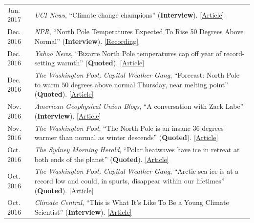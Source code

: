 \documentclass[margin,line,palatino,courier,10pt]{res}
\begin{document}
\begin{resume}
\begin{tabular}{@{}p{0.8in}p{4in}}
Jan. $2017$ & \textit{UCI News}, ``Climate change champions'' (\textbf{Interview}). \href{https://news.uci.edu/climate-change-champions/}{[Article]}\\
Dec. $2016$ & \textit{NPR}, ``North Pole Temperatures Expected To Rise 50 Degrees Above Normal'' (\textbf{Interview}). \href{http://www.npr.org/2016/12/21/506483966/north-pole-temperatures-expected-to-rise-50-degrees-above-normal}{[Recording]}\\
Dec. $2016$ & \textit{Yahoo News}, ``Bizarre North Pole temperatures cap off year of record-setting warmth'' (\textbf{Quoted}). \href{https://www.yahoo.com/news/bizarre-north-pole-temperatures-cap-off-year-of-record-setting-warmth-181727978.html?soc_src=social-sh&soc_trk=tw}{[Article]}\\
Dec. $2016$ & \textit{The Washington Post, Capital Weather Gang}, ``Forecast: North Pole to warm $50$ degrees above normal Thursday, near melting point'' (\textbf{Quoted}). \href{https://www.washingtonpost.com/news/capital-weather-gang/wp/2016/12/20/forecast-north-pole-to-warm-50-degrees-above-normal-thursday-near-melting-point/?dfgdfgdfgdfg&utm_term=.e648369ada7e}{[Article]}\\
Nov. $2016$ & \textit{American Geophysical Union Blogs}, ``A conversation with Zack Labe'' (\textbf{Interview}). \href{http://blogs.agu.org/mountainbeltway/2016/11/23/conversation-zack-labe/}{[Article]}\\
Nov. $2016$ & \textit{The Washington Post}, ``The North Pole is an insane 36 degrees warmer than normal as winter descends'' (\textbf{Quoted}). \href{https://www.washingtonpost.com/news/energy-environment/wp/2016/11/17/the-north-pole-is-an-insane-36-degrees-warmer-than-normal-as-winter-descends/?utm_term=.f2cb9596b3d8}{[Article]}\\
Oct. $2016$ & \textit{The Sydney Morning Herald}, ``Polar heatwaves have ice in retreat at both ends of the planet'' (\textbf{Quoted}). \href{http://www.smh.com.au/environment/climate-change/polar-heatwaves-have-ice-in-retreat-at-both-ends-of-the-planet-20161030-gse9q6.html}{[Article]}\\
Oct. $2016$ & \textit{The Washington Post, Capital Weather Gang}, ``Arctic sea ice is at a record low and could, in spurts, disappear within our lifetimes'' (\textbf{Quoted}). \href{https://www.washingtonpost.com/news/capital-weather-gang/wp/2016/10/27/arctic-sea-ice-is-at-a-record-low-and-could-in-spurts-disappear-within-our-lifetimes/}{[Article]}\\
Oct. $2016$ & \textit{Climate Central}, ``This is What It's Like To Be a Young Climate Scientist'' (\textbf{Interview}). \href{http://www.climatecentral.org/news/young-climate-scientists-interviews-20799}{[Article]}\\

\end{tabular}
\end{resume}
\end{document}
